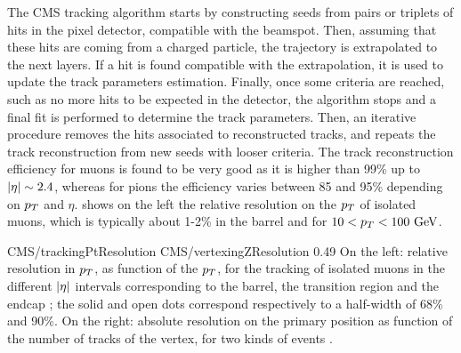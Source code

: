         The CMS tracking algorithm \cite{CMStracking} starts by constructing seeds from pairs or triplets of hits
        in the pixel detector, compatible with the beamspot. Then, assuming that these
        hits are coming from a charged particle, the trajectory is extrapolated to the
        next layers. If a hit is found compatible with the extrapolation, it is used to
        update the track parameters estimation. Finally, once some criteria are reached,
        such as no more hits to be expected in the detector, the algorithm stops and a
        final fit is performed to determine the track parameters. Then, an iterative procedure removes the
        hits associated to reconstructed tracks, and repeats the track reconstruction
        from new seeds with looser criteria.
        The track reconstruction efficiency for muons is found to be very good as it is
        higher than 99\% up to $\left| \eta \right| \sim 2.4$, whereas for pions the efficiency varies
        between 85 and 95\% depending on $p_T$ and $\eta$. 
        shows on the left the relative resolution on the $p_T$ of isolated muons, which
        is typically about 1-2\% in the barrel and for $10 < p_T < 100~\text{GeV}$.

                         {CMS/trackingPtResolution}
                         {CMS/vertexingZResolution}
                         {0.49}
                         {On the left: relative resolution in $p_T$, as function of the $p_T$, for the
                         tracking of isolated muons in the different $\left| \eta \right|$ intervals corresponding
                         to the barrel,
                         the transition region and the endcap ; the solid and open dots correspond respectively
                         to a half-width of 68\% and 90\%. On the right: absolute resolution on the
                         primary position as function of the number of tracks of the vertex,
                         for two kinds of events \cite{CMStracking}.}

